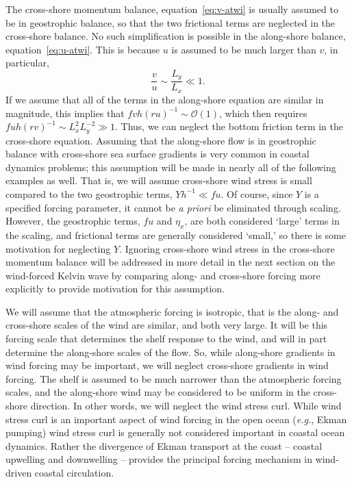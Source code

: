 \documentclass[11pt]{report}
\numberwithin{equation}{section}
\begin{document}
The cross-shore momentum balance, equation~\ref{eq:v-atwi} is usually assumed to be in geostrophic balance, so that the two frictional terms are neglected in the cross-shore balance.  No such simplification is possible in the along-shore balance, equation~\ref{eq:u-atwi}.  This is because $u$ is assumed to be much larger than $v$, in particular,
\begin{equation}
    \frac{v}{u} \sim \frac{L_y}{L_x} \ll 1.
\end{equation}
If we assume that all of the terms in the along-shore equation are similar in magnitude, this implies that $f v h (r u)^{-1} \sim \mathcal{O}(1)$, which then requires $f u h (r v)^{-1} \sim L_x^2 L_y^{-2} \gg 1$.  Thus, we can neglect the bottom friction term in the cross-shore equation.  Assuming that the along-shore flow is in geostrophic balance with cross-shore sea surface gradients is very common in coastal dynamics problems; this assumption will be made in nearly all of the following examples as well.  That is, we will assume cross-shore wind stress is small compared to the two geostrophic terms, $Y h^{-1} \ll fu$.  Of course, since $Y$ is a specified forcing parameter, it cannot be {\it a priori} be eliminated through scaling.  However, the geostrophic terms, $fu$ and $\eta_x$, are both considered `large' terms in the scaling, and frictional terms are generally considered `small,' so there is some motivation for neglecting $Y$.  Ignoring cross-shore wind stress in the cross-shore momentum balance will be addressed in more detail in the next section on the wind-forced Kelvin wave by comparing along- and cross-shore forcing more explicitly to provide motivation for this assumption.  

We will assume that the atmospheric forcing is isotropic, that is the along- and cross-shore scales of the wind are similar, and both very large.  It will be this forcing scale that determines the shelf response to the wind, and will in part determine the along-shore scales of the flow.  So, while along-shore gradients in wind forcing may be important, we will neglect cross-shore gradients in wind forcing.  The shelf is assumed to be much narrower than the atmospheric forcing scales, and the along-shore wind may be considered to be uniform in the cross-shore direction.  In other words, we will neglect the wind stress curl.  While wind stress curl is an important aspect of wind forcing in the open ocean (\emph{e.g.}, Ekman pumping) wind stress curl is generally not considered important in coastal ocean dynamics. Rather the divergence of Ekman transport at the coast -- coastal upwelling and downwelling -- provides the principal forcing mechanism in wind-driven coastal circulation.
\end{document}

